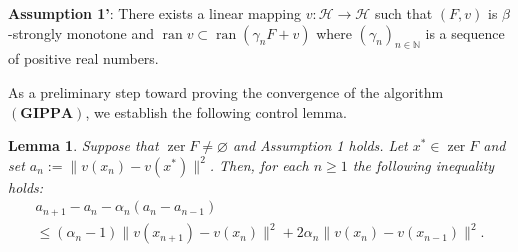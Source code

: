 \documentclass[11pt]{article}
\newtheorem{lemma}[theorem]{Lemma}
\theoremstyle{definition}
\theoremstyle{definition}
\theoremstyle{definition}
\newcommand{\ran}{\ensuremath{\operatorname{ran}}}
\newcommand{\zer}{\ensuremath{\operatorname{zer}}}
\begin{document}
\noindent \textbf{Assumption 1'}: There exists a  linear mapping \( v: \mathcal{H} \to \mathcal{H} \) such that  \( (F, v) \) is \( \beta \)-strongly monotone and \( \ran v \subset \ran (\gamma_n F + v) \) where $(\gamma_n)_{n\in \mathbb{N}}$ is a sequence of positive real numbers.

\medskip
As a preliminary step toward proving the convergence of the algorithm $(\mathbf{GIPPA})$, we establish the following control lemma.
\begin{lemma}\label{lem5}
	 {Suppose that $\zer F\neq \varnothing$ and Assumption 1 holds. Let  $x^*\in \zer F$ and set $a_n:=\|v(x_n)-v(x^*)\|^2$.} Then, for each $n\geq 1$ the following inequality holds:
	\begin{equation}\label{estim1}
	\begin{array}{l}
	a_{n+1}-a_n-{\alpha_n }(a_n-a_{n-1})\\
	\leq(\alpha_n-1)\|v(x_{n+1})-v(x_{n})\|^2 +2\alpha_n\|v(x_{n})-v(x_{n-1})\|^2.
	\end{array}
	\end{equation}
\end{lemma}
\end{document}
